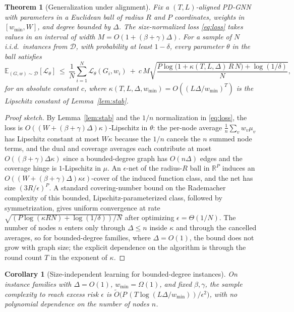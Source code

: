 \documentclass[11pt]{article}
\theoremstyle{plain}
\newtheorem{theorem}{Theorem}
\newtheorem{corollary}{Corollary}
\theoremstyle{definition}
\theoremstyle{remark}
\newcommand{\Dcal}{\mathcal{D}}
\newcommand{\real}{\mathbb{R}}
\newcommand{\PDGNN}{\textsc{PD-GNN}}
\begin{document}
\begin{theorem}[Generalization under alignment]\label{thm:gen}
Fix a $(T,L)$-aligned \PDGNN{} with parameters in a Euclidean ball of radius $R$
and $P$ coordinates, weights in $[w_{\min},W]$, and degree bounded by $\Delta$. The
size-normalized loss \eqref{eq:loss} takes values in an interval of width
$M=O(1+(\beta+\gamma)\Delta)$. For a sample of $N$ i.i.d.\ instances from $\Dcal$, with
probability at least $1-\delta$, every parameter $\theta$ in the ball satisfies
\[
\mathbb{E}_{(G,w)\sim\Dcal}[\mathcal{L}_\theta]\ \le\
\frac1N\sum_{i=1}^N\mathcal{L}_\theta(G_i,w_i)\ +\
c\,M\sqrt{\frac{P\log\bigl(1+\kappa(T,L,\Delta)\,R\,N\bigr)+\log(1/\delta)}{N}},
\]
for an absolute constant $c$, where
$\kappa(T,L,\Delta,w_{\min})=O((L\Delta/w_{\min})^T)$ is the Lipschitz constant of
Lemma~\ref{lem:stab}.
\end{theorem}
\begin{proof}[Proof sketch]
By Lemma~\ref{lem:stab} and the $1/n$ normalization in \eqref{eq:loss}, the loss
is $O((W+(\beta+\gamma)\Delta)\kappa)$-Lipschitz in $\theta$: the per-node average
$\frac1n\sum_v w_v\mu_v$ has Lipschitz constant at most $W\kappa$ because the
$1/n$ cancels the $n$ summed node terms, and the dual and coverage averages each
contribute at most $O((\beta+\gamma)\Delta\kappa)$ since a bounded-degree graph
has $O(n\Delta)$ edges and the coverage hinge is $1$-Lipschitz in $\mu$. An
$\epsilon$-net of the radius-$R$ ball in $\real^P$ induces an
$O((W+(\beta+\gamma)\Delta)\kappa\epsilon)$-cover of the induced function class, and the
net has size $(3R/\epsilon)^P$. A standard covering-number bound on the
Rademacher complexity of this bounded, Lipschitz-parameterized class, followed by
symmetrization, gives uniform convergence at rate
$\sqrt{(P\log(\kappa R N)+\log(1/\delta))/N}$ after optimizing
$\epsilon=\Theta(1/N)$. The number of nodes $n$ enters only through $\Delta\le n$
inside $\kappa$ and through the cancelled averages, so for bounded-degree
families, where $\Delta=O(1)$, the bound does not grow with graph size; the
explicit dependence on the algorithm is through the round count $T$ in the
exponent of $\kappa$.
\end{proof}

\begin{corollary}[Size-independent learning for bounded-degree instances]\label{cor:size}
On instance families with $\Delta=O(1)$, $w_{\min}=\Omega(1)$, and fixed
$\beta,\gamma$, the sample complexity to reach excess risk $\epsilon$ is
$\tilde O\!\bigl(P\,(T\log(L\Delta/w_{\min}))/\epsilon^2\bigr)$, with no polynomial
dependence on the number of nodes $n$.
\end{corollary}
\end{document}
